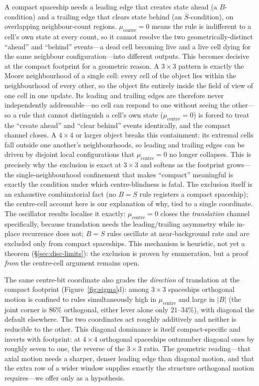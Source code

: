 \documentclass{article}
\begin{document}
A compact spaceship needs a leading edge that creates state ahead (a
$B$-condition) and a trailing edge that clears state behind (an
$\overline{S}$-condition), on overlapping neighbour-count regions.
$\mu_{\text{centre}}=0$ means the rule is indifferent to a cell's own state at
every count, so it cannot resolve the two geometrically-distinct ``ahead'' and
``behind'' events---a dead cell becoming live and a live cell dying for the same
neighbour configuration---into different outputs. This becomes decisive at the
compact footprint for a geometric reason. A $3{\times}3$ pattern is exactly the
Moore neighbourhood of a single cell: every cell of the object lies within the
neighbourhood of every other, so the object fits entirely inside the field of
view of one cell in one update. Its leading and trailing edges are therefore
never independently addressable---no cell can respond to one without seeing the
other---so a rule that cannot distinguish a cell's own state
($\mu_{\text{centre}}=0$) is forced to treat the ``create ahead'' and ``clear
behind'' events identically, and the compact channel closes. A $4{\times}4$ or
larger object breaks this containment: its extremal cells fall outside one
another's neighbourhoods, so leading and trailing edges can be driven by
disjoint local configurations that $\mu_{\text{centre}}=0$ no longer collapses.
This is precisely why the exclusion is exact at $3{\times}3$ and softens as the
footprint grows---the single-neighbourhood confinement that makes ``compact''
meaningful is exactly the condition under which centre-blindness is fatal.
The exclusion itself is an exhaustive combinatorial fact (no $B=S$ rule registers
a compact spaceship); the centre-cell account here is our explanation of why,
tied to a single coordinate. The oscillator results
localise it exactly: $\mu_{\text{centre}}=0$ closes the \emph{translation} channel
specifically, because translation needs the leading/trailing asymmetry while
in-place recurrence does not; $B=S$ rules oscillate at near-background rate and
are excluded only from compact spaceships. This mechanism is heuristic, not yet a
theorem (\S\ref{sec:disc-limits}): the exclusion is proven by enumeration, but a
proof \emph{from} the centre-cell argument remains open.

The same centre-bit coordinate also grades the \emph{direction} of translation
at the compact footprint (Figure~\ref{fig:sigma}d): among $3{\times}3$ spaceships
orthogonal motion is confined to rules simultaneously high in $\mu_{\text{centre}}$
and large in $|B|$ (the joint corner is $86\%$ orthogonal, either lever alone only
$21$--$34\%$), with diagonal the default elsewhere. The two coordinates act roughly
additively and neither is reducible to the other. This diagonal dominance is
itself compact-specific and inverts with footprint: at $4{\times}4$ orthogonal
spaceships outnumber diagonal ones by roughly seven to one, the reverse of the
$3{\times}3$ ratio. The geometric reading---that axial motion needs a sharper,
denser leading edge than diagonal motion, and that the extra row of a wider window
supplies exactly the structure orthogonal motion requires---we offer only as a
hypothesis.
\end{document}
